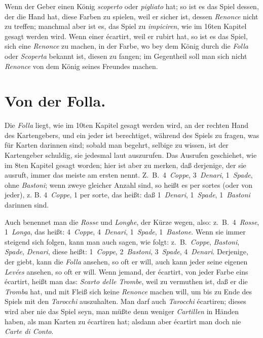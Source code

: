 \documentclass[11pt,a6paper,twoside]{article}
\begin{document}
Wenn der Geber einen König \textit{scoperto} oder \textit{pigliato} hat; so ist es das Spiel dessen, der die Hand hat, diese Farben zu spielen, weil er sicher ist, dessen \textit{Renonce} nicht zu treffen; manchmal aber ist es, das Spiel zu \textit{impiciren}, wie im 16ten Kapitel gesagt werden wird. Wenn einer écartirt, weil er rubirt hat, so ist es das Spiel, sich eine \textit{Renonce} zu machen, in der Farbe, wo bey dem König durch die \textit{Folla} oder \textit{Scoperta} bekannt ist, diesen zu fangen; im Gegentheil soll man sich nicht \textit{Renonce} von dem König seines Freundes machen.


\section{Von der Folla.}

Die \textit{Folla} liegt, wie im 10ten Kapitel gesagt werden wird, an der rechten Hand des Kartengebers, und ein jeder ist berechtiget, während des Spiels zu fragen, was für Karten darinnen sind; sobald man begehrt, selbige zu wissen, ist der Kartengeber schuldig, sie jedesmal laut auszurufen. Das Ausrufen geschiehet, wie im 8ten Kapitel gesagt worden; hier ist aber zu merken, daß derjenige, der sie ausruft, immer das meiste am ersten nennt. Z.\ B.\ 4~\textit{Coppe}, 3~\textit{Denari}, 1~\textit{Spade}, ohne \textit{Bastoni}; wenn zweye gleicher Anzahl sind, so heißt es per sortes (oder von jeder), z. B. 4~\textit{Coppe}, 1 per sorte, das heißt: daß 1~\textit{Denari}, 1~\textit{Spade}, 1~\textit{Bastoni} darinnen sind.

Auch benennet man die \mbox{\textit{Rosse}} und \mbox{\textit{Longhe}}, der Kürze wegen, also: z.\ B.\ 4~\mbox{\textit{Rosse}}, 1~\mbox{\textit{Longa}}, das heißt: 4~\textit{Coppe}, 4~\textit{Denari}, 1~\textit{Spade}, 1~\textit{Bastone}. Wenn sie immer steigend sich folgen, kann man auch sagen, wie folgt: z.\ B.\ \textit{Coppe}, \textit{Bastoni}, \textit{Spade}, \textit{Denari}, diese heißt: 1~\textit{Coppe}, 2~\textit{Bastoni}, 3~\textit{Spade}, 4~\textit{Denari}. Derjenige, der giebt, kann die \textit{Folla} ansehen, so oft er will, auch kann jeder seine eigenen \textit{Levées} ansehen, so oft er will. Wenn jemand, der écartirt, von jeder Farbe eins écartirt, heißt man das: \textit{Scarto delle Trombe}, weil zu vermuthen ist, daß er die \textit{Tromba} hat, und mit Fleiß sich keine \textit{Renonce} machen will, um bis zu Ende des Spiels mit den \textit{Tarocchi} auszuhalten. Man darf auch \textit{Tarocchi} écartiren; dieses wird aber nie das Spiel seyn, man müßte denn weniger \textit{Cartillen} in Händen haben, als man Karten zu écartiren hat; alsdann aber écartirt man doch nie \textit{Carte di Conto}.
\end{document}
